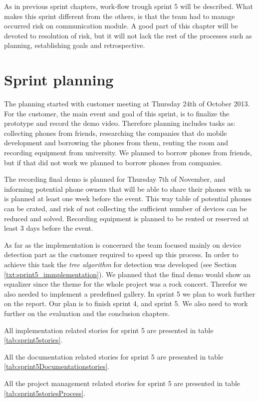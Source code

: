 As in previous sprint chapters, work-flow trough sprint 5 will be described. What makes this sprint different from the others, is that the team had to manage occurred risk on communication module. A good part of this chapter will be devoted to resolution of risk, but it will not lack the rest of the processes such as planning, establishing goals and retrospective.

\section{Sprint planning}

The planning started with customer meeting at Thursday 24th of October 2013. For the customer, the main event and goal of this sprint, is to finalize the prototype and record the demo video. Therefore planning includes tasks as: collecting phones from friends, researching the companies that do mobile development and borrowing the phones from them, renting the room and recording equipment from university. We planned to borrow phones from friends, but if that did not work we planned to borrow phones from companies.

The recording final demo is planned for Thursday 7th of November, and informing potential phone owners that will be able to share their phones with us is planned at least one week before the event. This way table of potential phones can be crated, and risk of not collecting the sufficient number of devices can be reduced and solved. Recording equipment is planned to be rented or reserved at least 3 days before the event.

As far as the implementation is concerned the team focused mainly on device detection part as the customer required to speed up this process. In order to achieve this task the \textit{tree algorithm} for detection was developed (see Section \ref{txt:sprint5_immplementation}). We planned that the final demo would show an equalizer since the theme for the whole project was a rock concert. Therefor we also needed to implement a predefined gallery.
In sprint 5 we plan to work further on the report. Our plan is to finish sprint 4, and sprint 5. We also need to work further on the evaluation and the conclusion chapters.  

All implementation related stories for sprint 5 are presented in table \ref{tab:sprint5stories}.


All the documentation related stories for sprint 5 are presented in table \ref{tab:sprint5Documentationstories}.

All the project management related stories for sprint 5 are presented in table \ref{tab:sprint5storiesProcess}.


